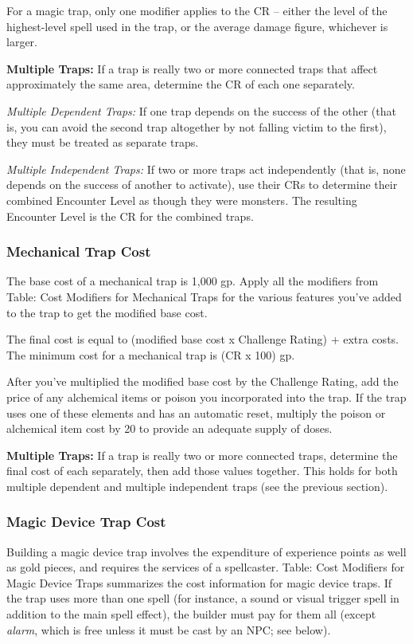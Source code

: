 For a magic trap, only one modifier applies to the CR -- either the level of the 
highest-level spell used in the trap, or the average damage figure, whichever is 
larger.

\textbf{Multiple Traps:} If a trap is really two or more connected traps that affect 
approximately the same area, determine the CR of each one separately.

\textit{Multiple Dependent Traps:} If one trap depends on the success of the other 
(that is, you can avoid the second trap altogether by not falling victim to the 
first), they must be treated as separate traps.

\textit{Multiple Independent Traps:} If two or more traps act independently (that 
is, none depends on the success of another to activate), use their CRs to determine 
their combined Encounter Level as though they were monsters\textit{. }The resulting 
Encounter Level is the CR for the combined traps.

\subsubsection{Mechanical Trap Cost}

The base cost of a mechanical trap is 1,000 gp. Apply all the modifiers from Table: 
Cost Modifiers for Mechanical Traps for the various features you've added to the 
trap to get the modified base cost.

The final cost is equal to (modified base cost x Challenge Rating) + extra costs. 
The minimum cost for a mechanical trap is (CR x 100) gp.

After you've multiplied the modified base cost by the Challenge Rating, add the 
price of any alchemical items or poison you incorporated into the trap. If the 
trap uses one of these elements and has an automatic reset, multiply the poison 
or alchemical item cost by 20 to provide an adequate supply of doses.

\textbf{Multiple Traps:} If a trap is really two or more connected traps, determine 
the final cost of each separately, then add those values together. This holds for 
both multiple dependent and multiple independent traps (see the previous section).

\subsubsection{Magic Device Trap Cost}

Building a magic device trap involves the expenditure of experience points as well 
as gold pieces, and requires the services of a spellcaster. Table: Cost Modifiers 
for Magic Device Traps summarizes the cost information for magic device traps. 
If the trap uses more than one spell (for instance, a sound or visual trigger spell 
in addition to the main spell effect), the builder must pay for them all (except 
\textit{alarm}, which is free unless it must be cast by an NPC; see below).

